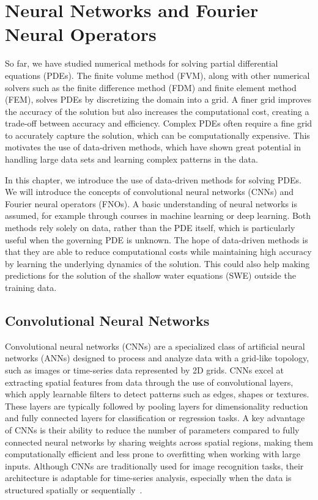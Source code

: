 \chapter{Neural Networks and Fourier Neural Operators}\label{ch:FNO+NN}
So far, we have studied numerical methods for solving partial differential equations (PDEs).
The finite volume method (FVM), along with other numerical solvers such as the finite difference method (FDM) and finite element method (FEM), solves PDEs by discretizing the domain into a grid.
A finer grid improves the accuracy of the solution but also increases the computational cost, creating a trade-off between accuracy and efficiency.
Complex PDEs often require a fine grid to accurately capture the solution, which can be computationally expensive.
This motivates the use of data-driven methods, which have shown great potential in handling large data sets and learning complex patterns in the data.

In this chapter, we introduce the use of data-driven methods for solving PDEs.
We will introduce the concepts of convolutional neural networks (CNNs) and Fourier neural operators (FNOs).
A basic understanding of neural networks is assumed, for example through courses in machine learning or deep learning.
Both methods rely solely on data, rather than the PDE itself, which is particularly useful when the governing PDE is unknown.
The hope of data-driven methods is that they are able to reduce computational costs while maintaining high accuracy by learning the underlying dynamics of the solution.
This could also help making predictions for the solution of the shallow water equations (SWE) outside the training data.


\section{Convolutional Neural Networks}\label{sec:CNN}
Convolutional neural networks (CNNs) are a specialized class of artificial neural networks (ANNs) designed to process and analyze data with a grid-like topology, such as images or time-series data represented by 2D grids.
CNNs excel at extracting spatial features from data through the use of convolutional layers, which apply learnable filters to detect patterns such as edges, shapes or textures.
These layers are typically followed by pooling layers for dimensionality reduction and fully connected layers for classification or regression tasks.
A key advantage of CNNs is their ability to reduce the number of parameters compared to fully connected neural networks by sharing weights across spatial regions, making them computationally efficient and less prone to overfitting when working with large inputs.
Although CNNs are traditionally used for image recognition tasks, their architecture is adaptable for time-series analysis, especially when the data is structured spatially or sequentially~\cite{chollet2017comprehensive}.

